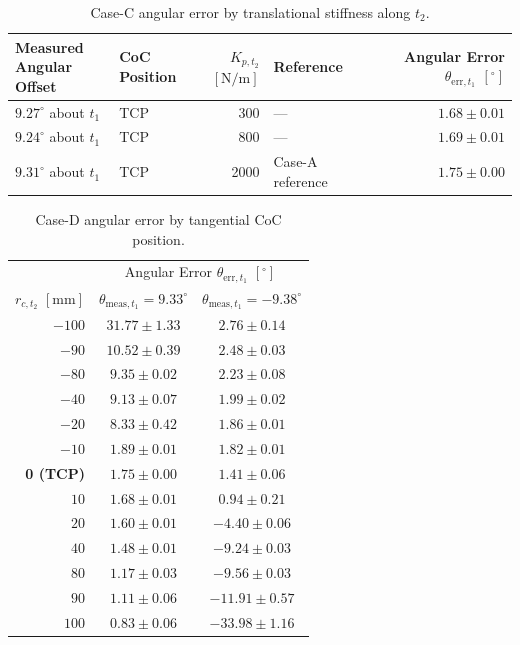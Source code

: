 \begin{table}[H]
\centering
\small
\caption{Case-C angular error by translational stiffness along \(t_2\).}
\label{tab:results_case_c}
\begin{tabular}{@{}llrlr@{}}
\toprule
\shortstack[l]{Measured\\Angular Offset} & \shortstack[l]{CoC\\Position} &
\(K_{p,t_2}\) \([\mathrm{N/m}]\) & Reference &
    Angular Error \(\theta_{\mathrm{err},t_1}\) \([{}^\circ]\) \\
\midrule
\(9.27^\circ\) about \(t_1\) & TCP & 300 & --- & \(1.68\pm0.01\) \\
\(9.24^\circ\) about \(t_1\) & TCP & 800 & --- & \(1.69\pm0.01\) \\
\(9.31^\circ\) about \(t_1\) & TCP & 2000 & Case-A reference & \(1.75\pm0.00\) \\
\bottomrule
\end{tabular}
\end{table}

\begin{table}[H]
\centering
\small
\caption{Case-D angular error by tangential CoC position.}
\label{tab:results_case_d}
\begin{tabular}{@{}rcc@{}}
\toprule
& \multicolumn{2}{c}{Angular Error \(\theta_{\mathrm{err},t_1}\) \([{}^\circ]\)} \\
\cmidrule(l){2-3}
\(r_{c,t_2}\) \([\mathrm{mm}]\) &
\(\theta_{\mathrm{meas},t_1}=9.33^\circ\) & \(\theta_{\mathrm{meas},t_1}=-9.38^\circ\) \\
\midrule
\(-100\) & \(31.77\pm1.33\) & \(2.76\pm0.14\) \\
\(-90\) & \(10.52\pm0.39\) & \(2.48\pm0.03\) \\
\(-80\) & \(9.35\pm0.02\) & \(2.23\pm0.08\) \\
\(-40\) & \(9.13\pm0.07\) & \(1.99\pm0.02\) \\
\(-20\) & \(8.33\pm0.42\) & \(1.86\pm0.01\) \\
\(-10\) & \(1.89\pm0.01\) & \(1.82\pm0.01\) \\
\textbf{0 (TCP)} & \(1.75\pm0.00\) & \(1.41\pm0.06\) \\
\(10\) & \(1.68\pm0.01\) & \(0.94\pm0.21\) \\
\(20\) & \(1.60\pm0.01\) & \(-4.40\pm0.06\) \\
\(40\) & \(1.48\pm0.01\) & \(-9.24\pm0.03\) \\
\(80\) & \(1.17\pm0.03\) & \(-9.56\pm0.03\) \\
\(90\) & \(1.11\pm0.06\) & \(-11.91\pm0.57\) \\
\(100\) & \(0.83\pm0.06\) & \(-33.98\pm1.16\) \\
\bottomrule
\end{tabular}
\end{table}
